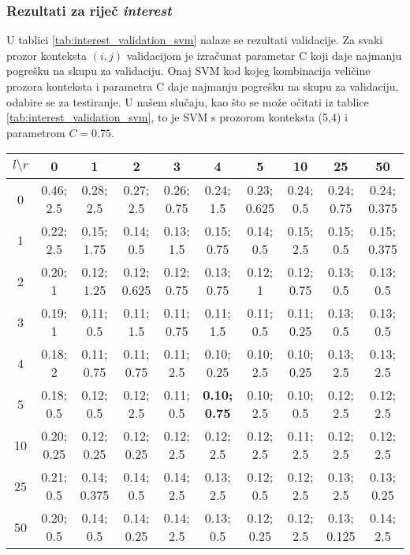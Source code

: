 \documentclass[10pt, a4paper]{article}
\begin{document}
\subsubsection{Rezultati za riječ \emph{interest}}
U tablici \ref{tab:interest_validation_svm} nalaze se rezultati validacije.
Za svaki prozor konteksta $(i,j)$ validacijom je izračunat parametar C koji
daje najmanju pogrešku na skupu za validaciju. Onaj SVM kod kojeg kombinacija veličine prozora konteksta i parametra C daje najmanju pogrešku na skupu za validaciju, odabire se za testiranje.
U našem slučaju, kao što se može očitati iz tablice \ref{tab:interest_validation_svm}, to je SVM s prozorom konteksta (5,4) i parametrom $C=0.75$.
\begin{table*}[!hbtp]
\caption{Pogreške i vrijednosti parametara C nakon provedene validacije SVM-a za riječ \emph{interest}}
\label{tab:interest_validation_svm}
\begin{center}
\begin{tabular}{|c|ccccccccc|}
\hline
$l \setminus r$ & 0 & 1 & 2 & 3 & 4 & 5 & 10 & 25 & 50 \\
\hline
0 & 0.46; 2.5 & 0.28; 2.5 & 0.27; 2.5 & 0.26; 0.75 & 0.24; 1.5 & 0.23; 0.625 & 0.24; 0.5 & 0.24; 0.75 & 0.24; 0.375 \\
1 & 0.22; 2.5 & 0.15; 1.75 & 0.14; 0.5 & 0.13; 1.5 & 0.15; 0.75 & 0.14; 0.5 & 0.15; 2.5 & 0.15; 0.5 & 0.15; 0.375 \\
2 & 0.20; 1 & 0.12; 1.25 & 0.12; 0.625 & 0.12; 0.75 & 0.13; 0.75 & 0.12; 1 & 0.12; 0.75 & 0.13; 0.5 & 0.13; 0.5 \\
3 & 0.19; 1 & 0.11; 0.5 & 0.11; 1.5 & 0.11; 0.75 & 0.11; 1.5 & 0.11; 0.5 & 0.11; 0.25 & 0.13; 0.5 & 0.13; 0.5 \\
4 & 0.18; 2 & 0.11; 0.75 & 0.11; 0.75 & 0.11; 2.5 & 0.10; 0.25 & 0.10; 2.5 & 0.10; 0.25 & 0.13; 2.5 & 0.13; 2.5 \\
5 & 0.18; 0.5 & 0.12; 0.5 & 0.12; 2.5 & 0.11; 0.5 & \textbf{0.10; 0.75} & 0.10; 2.5 & 0.10; 0.5 & 0.12; 2.5 & 0.12; 2.5 \\
10 & 0.20; 0.25 & 0.12; 0.25 & 0.12; 0.25 & 0.12; 2.5 & 0.12; 2.5 & 0.12; 2.5 & 0.11; 2.5 & 0.12; 2.5 & 0.12; 2.5 \\
25 & 0.21; 0.5 & 0.14; 0.375 & 0.14; 0.5 & 0.14; 2.5 & 0.13; 2.5 & 0.12; 0.5 & 0.12; 2.5 & 0.13; 2.5 & 0.13; 0.25 \\
50 & 0.20; 0.5 & 0.14; 0.5 & 0.14; 0.25 & 0.14; 2.5 & 0.13; 0.5 & 0.12; 0.25 & 0.12; 2.5 & 0.13; 0.125 & 0.14; 2.5 \\
\hline
\end{tabular}
\end{center}
\end{table*}
\end{document}
